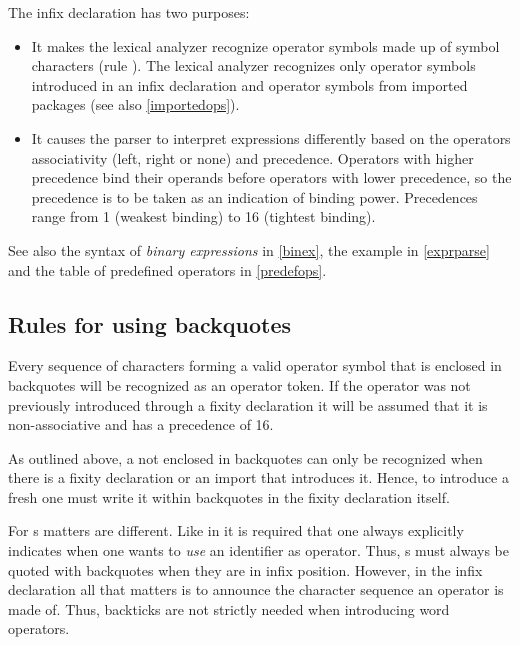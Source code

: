 The infix declaration has two purposes:

\begin{itemize}
\item It makes the lexical analyzer recognize operator symbols made up of symbol characters (rule ). The lexical analyzer recognizes only operator symbols introduced in an infix declaration and operator symbols from imported packages (see also \autoref{importedops}).

\item It causes the parser to interpret expressions differently based on the operators associativity (left, right or none) and precedence.
Operators with higher precedence bind their operands before operators with lower precedence, so the precedence is to be taken as an indication of binding power.
Precedences range from 1 (weakest binding) to 16 (tightest binding).

\end{itemize}

See also the syntax of \emph{binary expressions} in \autoref{binex}, the example in \autoref{exprparse} and the table of predefined operators in \autoref{predefops}.

\subsection{Rules for using backquotes}

Every sequence of characters forming a valid operator symbol that is enclosed in backquotes will be recognized as an operator token. If the operator was not previously introduced through a fixity declaration it will be assumed that it is non-associative and has a precedence of 16.

As outlined above, a  not enclosed in backquotes can only be recognized when there is a fixity declaration or an import that introduces it. Hence, to introduce a fresh  one must write it within backquotes in the fixity declaration itself.

For s matters are different. Like in \haskell{} it is required that one always explicitly indicates when one wants to \textit{use} an identifier as operator. Thus, s must always be quoted with backquotes when they are in infix position. However, in the infix declaration all that matters is to announce the character sequence an operator is made of. Thus, backticks are not strictly needed when introducing word operators.

